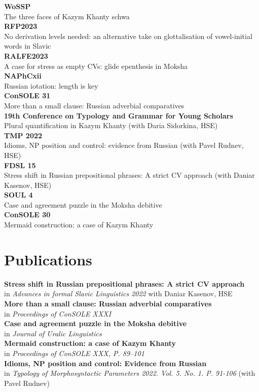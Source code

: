 \documentclass[11pt]{article} %
\begin{document}
 \textbf{WoSSP}\\ The three faces of Kazym Khanty schwa\\
 \textbf{RFP2023}\\ No derivation levels needed: an alternative take on glottalisation of vowel-initial words in Slavic\\
 \textbf{RALFE2023}\\ A case for stress as empty CVs: glide epenthesis in Moksha\\
 \textbf{NAPhCxii}\\ Russian iotation: length is key\\
 \textbf{ConSOLE 31}\\ More than a small clause: Russian adverbial comparatives\\
 \textbf{19th Conference on Typology and Grammar for Young Scholars}\\ Plural quantification in Kazym Khanty (with Daria Sidorkina, HSE)\\
 \textbf{TMP 2022} \\Idioms, NP position and control: evidence from Russian (with Pavel Rudnev, HSE)\\
 \textbf{FDSL 15} \\Stress shift in Russian prepositional phrases: A strict CV approach (with Daniar Kasenov, HSE)\\
 \textbf{SOUL 4}\\ Case and agreement puzzle in the Moksha debitive\\
 \textbf{ConSOLE 30}\\ Mermaid construction: a case of Kazym Khanty\\

\section*{Publications}
 \textbf{Stress shift in Russian prepositional phrases: A strict CV approach} \\ in \emph{Advances in formal Slavic Linguistics 2022} with Daniar Kasenov, HSE\\
 \textbf{More than a small clause: Russian adverbial comparatives} \\ in \emph{Proceedings of ConSOLE XXXI}\\
 \textbf{Case and agreement puzzle in the Moksha debitive} \\ in \emph{Journal of Uralic Linguistics}\\
 \textbf{Mermaid construction: a case of Kazym Khanty}\\ in \emph{Proceedings of ConSOLE XXX, P. 89--101}\\
 \textbf{Idioms, NP position and control: Evidence from Russian}\\ in \emph{Typology of Morphosyntactic Parameters 2022. Vol. 5. No. 1. P. 91-106} (with Pavel Rudnev)\\
\end{document}
